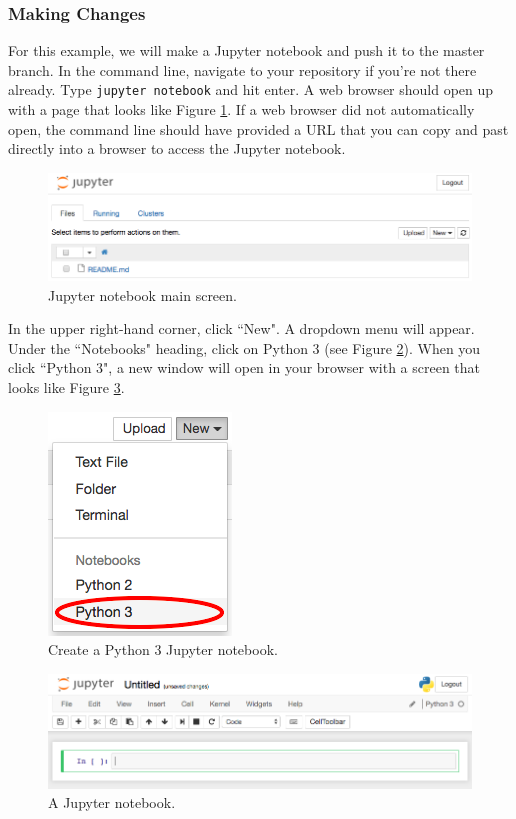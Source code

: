 \documentclass[11pt,a4paper]{article}
\begin{document}
\subsubsection{Making Changes}
For this example, we will make a Jupyter notebook and push it to the master branch.
In the command line, navigate to your repository if you're not there already.
Type \texttt{jupyter notebook} and hit enter.
A web browser should open up with a page that looks like Figure \ref{fig:jupyter-dir}.
If a web browser did not automatically open, the command line should have provided a URL that you can copy and past directly into a browser to access the Jupyter notebook.

\begin{figure}[h]
\centering
\includegraphics[width=.7\textwidth]{figures/jupyter_dir.png}
\caption{Jupyter notebook main screen.}
\label{fig:jupyter-dir}
\end{figure}

In the upper right-hand corner, click ``New".
A dropdown menu will appear.
Under the ``Notebooks" heading, click on Python 3 (see Figure \ref{fig:jupyter-dropdown}).
When you click ``Python 3", a new window will open in your browser with a screen that looks like Figure \ref{fig:jupyter}.

\begin{figure}[h]
\centering
\includegraphics[width=.3\textwidth]{figures/jupyter_dropdown.png}
\caption{Create a Python 3 Jupyter notebook.}
\label{fig:jupyter-dropdown}
\end{figure}

\begin{figure}[h]
\centering
\includegraphics[width=.7\textwidth]{figures/jupyter.png}
\caption{A Jupyter notebook.}
\label{fig:jupyter}
\end{figure}
\end{document}

